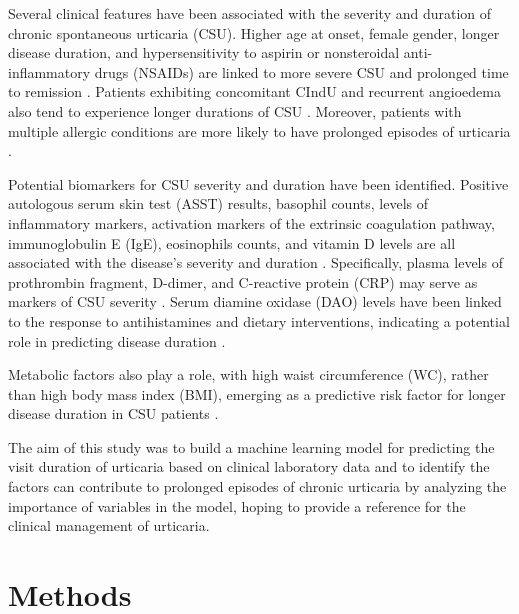 \documentclass[final,1p,times,authoryear]{elsarticle}
\begin{document}
Several clinical features have been associated with the severity and duration of chronic spontaneous urticaria (CSU). Higher age at onset, female gender, longer disease duration, and hypersensitivity to aspirin or nonsteroidal anti-inflammatory drugs (NSAIDs) are linked to more severe CSU and prolonged time to remission \citep{SanchezBorges2017Factors,Rabelo-Filardi2013Parameters}. Patients exhibiting concomitant CIndU and recurrent angioedema also tend to experience longer durations of CSU \citep{SanchezBorges2017Factors, Curto-Barredo2018Clinical}. Moreover, patients with multiple allergic conditions are more likely to have prolonged episodes of urticaria \citep{Lin2011Predictive}.

Potential biomarkers for CSU severity and duration have been identified. Positive autologous serum skin test (ASST) results, basophil counts, levels of inflammatory markers, activation markers of the extrinsic coagulation pathway, immunoglobulin E (IgE), eosinophils counts, and vitamin D levels are all associated with the disease's severity and duration \citep{SanchezBorges2017Factors,Rabelo-Filardi2013Parameters, Kolkhir2019Eosinopenia}. Specifically, plasma levels of prothrombin fragment, D-dimer, and C-reactive protein (CRP) may serve as markers of CSU severity \citep{Rabelo-Filardi2013Parameters}. Serum diamine oxidase (DAO) levels have been linked to the response to antihistamines and dietary interventions, indicating a potential role in predicting disease duration \citep{Chiang2022Predictors}.



Metabolic factors also play a role, with high waist circumference (WC), rather than high body mass index (BMI), emerging as a predictive risk factor for longer disease duration in CSU patients \citep{Kim2021High}.

The aim of this study was to build a machine learning model for predicting the visit duration of urticaria based on clinical laboratory data and to identify the factors can contribute to prolonged episodes of chronic urticaria by analyzing the importance of variables in the model, hoping to provide a reference for the clinical management of urticaria.

\section{Methods}\label{Methods}
\end{document}
